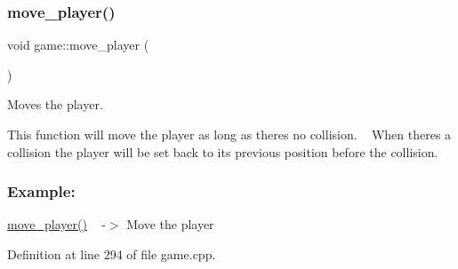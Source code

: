 \subsubsection{\texorpdfstring{move\+\_\+player()}{move\_player()}}
{\footnotesize\ttfamily void game\+::move\+\_\+player (\begin{DoxyParamCaption}{ }\end{DoxyParamCaption})\hspace{0.3cm}{\ttfamily [private]}}



Moves the player. 

This function will move the player as long as there\textquotesingle{}s no collision. ~\newline
When there\textquotesingle{}s a collision the player will be set back to its previous position before the collision.~\newline


\subsubsection*{Example\+: }

\hyperlink{classgame_ab13015cdc535671de1dd7a5a7970a238}{move\+\_\+player()} ~\newline
-\/$>$ Move the player 

Definition at line 294 of file game.\+cpp.

